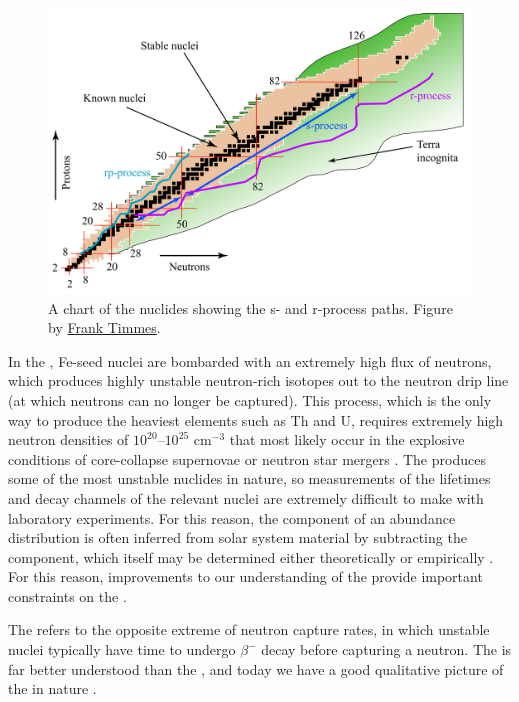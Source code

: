 \begin{figure}
 \begin{center}\includegraphics[width=\textwidth]{fig-timmes_table_nuclei02}\end{center}
 \caption{A chart of the nuclides showing the s- and r-process paths. Figure by \href{http://cococubed.asu.edu/pix_pages/nuclide_chart.shtml}{Frank Timmes}.}\label{fig:chartofnuclides}
\end{figure}

In the \rprocess, Fe-seed nuclei are bombarded with an extremely high flux of neutrons, which produces highly unstable neutron-rich isotopes out to the neutron drip line (at which neutrons can no longer be captured). This process, which is the only way to produce the heaviest elements such as Th and U, requires extremely high neutron densities of $10^{20}$--$10^{25}$ cm$^{-3}$ that most likely occur in the explosive conditions of core-collapse supernovae or neutron star mergers \citep[for a recent review of possible \rprocess sites, see][]{Thielemann:2011iy}. The \rprocess produces some of the most unstable nuclides in nature, so measurements of the lifetimes and decay channels of the relevant nuclei are extremely difficult to make with laboratory experiments. For this reason, the \rprocess component of an abundance distribution is often inferred from solar system material by subtracting the \sprocess component, which itself may be determined either theoretically \citep[e.g.,][]{Arlandini:1999eh,Goriely:1999wj,Sneden:2008cf} or empirically \citep[e.g.,][]{Simmerer:2004ib}. For this reason, improvements to our understanding of the \sprocess provide important constraints on the \rprocess.

The \sprocess refers to the opposite extreme of neutron capture rates, in which unstable nuclei typically have time to undergo $\beta^-$ decay before capturing a neutron. The \sprocess is far better understood than the \rprocess, and today we have a good qualitative picture of the \sprocess in nature \citep[e.g.,][]{Busso:1999ig,Herwig:2005jn,Karakas:2014jt}.

